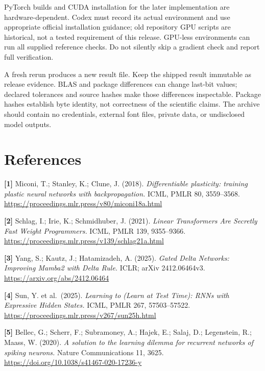 \documentclass[
  11pt,
  a4paper,
]{article}
\begin{document}
PyTorch builds and CUDA installation for the later implementation are
hardware-dependent. Codex must record its actual environment and use
appropriate official installation guidance; old repository GPU scripts
are historical, not a tested requirement of this release. GPU-less
environments can run all supplied reference checks. Do not silently skip
a gradient check and report full verification.

A fresh rerun produces a new result file. Keep the shipped result
immutable as release evidence. BLAS and package differences can change
last-bit values; declared tolerances and source hashes make those
differences inspectable. Package hashes establish byte identity, not
correctness of the scientific claims. The archive should contain no
credentials, external font files, private data, or undisclosed model
outputs.


\section*{References}\label{references}

\small

\textbf{{[}1{]}} Miconi, T.; Stanley, K.; Clune, J. (2018).
\emph{Differentiable plasticity: training plastic neural networks with
backpropagation.} ICML, PMLR 80, 3559--3568.
\url{https://proceedings.mlr.press/v80/miconi18a.html}

\textbf{{[}2{]}} Schlag, I.; Irie, K.; Schmidhuber, J. (2021).
\emph{Linear Transformers Are Secretly Fast Weight Programmers.} ICML,
PMLR 139, 9355--9366.
\url{https://proceedings.mlr.press/v139/schlag21a.html}

\textbf{{[}3{]}} Yang, S.; Kautz, J.; Hatamizadeh, A. (2025).
\emph{Gated Delta Networks: Improving Mamba2 with Delta Rule.} ICLR;
arXiv 2412.06464v3. \url{https://arxiv.org/abs/2412.06464}

\textbf{{[}4{]}} Sun, Y. et al.~(2025). \emph{Learning to (Learn at Test
Time): RNNs with Expressive Hidden States.} ICML, PMLR 267,
57503--57522. \url{https://proceedings.mlr.press/v267/sun25h.html}

\textbf{{[}5{]}} Bellec, G.; Scherr, F.; Subramoney, A.; Hajek, E.;
Salaj, D.; Legenstein, R.; Maass, W. (2020). \emph{A solution to the
learning dilemma for recurrent networks of spiking neurons.} Nature
Communications 11, 3625.
\url{https://doi.org/10.1038/s41467-020-17236-y}
\end{document}

